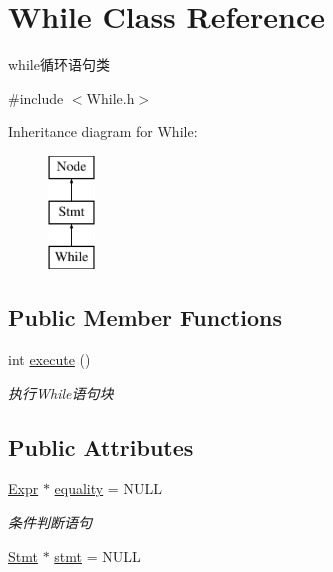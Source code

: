 \hypertarget{class_while}{}\section{While Class Reference}
\label{class_while}


while循环语句类  




{\ttfamily \#include $<$While.\+h$>$}

Inheritance diagram for While\+:\begin{figure}[H]
\begin{center}
\leavevmode
\includegraphics[height=3.000000cm]{class_while}
\end{center}
\end{figure}
\subsection*{Public Member Functions}
\begin{DoxyCompactItemize}
\item 
\mbox{\label{class_while_a23b58565983130bb54577f4399ffd822}} 
int \hyperlink{class_while_a23b58565983130bb54577f4399ffd822}{execute} ()
\begin{DoxyCompactList}\small\item\em 执行\+While语句块 \end{DoxyCompactList}\end{DoxyCompactItemize}
\subsection*{Public Attributes}
\begin{DoxyCompactItemize}
\item 
\mbox{\label{class_while_a14af77714254099c0cc465944ef67dd3}} 
\hyperlink{class_expr}{Expr} $\ast$ \hyperlink{class_while_a14af77714254099c0cc465944ef67dd3}{equality} = N\+U\+LL
\begin{DoxyCompactList}\small\item\em 条件判断语句 \end{DoxyCompactList}\item 
\hyperlink{class_stmt}{Stmt} $\ast$ \hyperlink{class_while_a97dfbf50f27b969c5b765ecfb1ef4ac2}{stmt} = N\+U\+LL
\end{DoxyCompactItemize}
